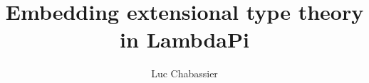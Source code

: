 \documentclass[12pt]{article}
\title{Embedding extensional type theory in LambdaPi}
\author{Luc Chabassier}
\begin{document}
\frenchspacing

\maketitle



\end{document}
